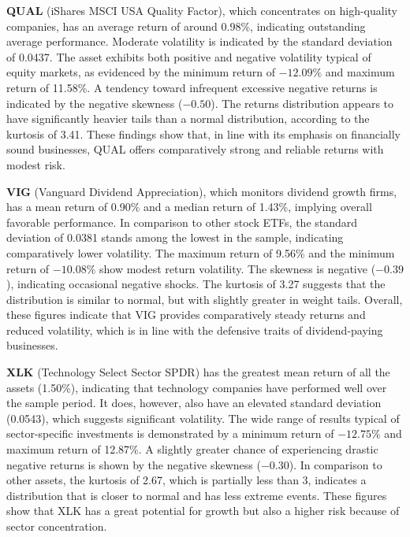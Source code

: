 \documentclass[12pt]{article}
\begin{document}
\textbf{QUAL} (iShares MSCI USA Quality Factor), which concentrates on high-quality companies, has an average return of around 0.98\%, indicating outstanding average performance. Moderate volatility is indicated by the standard deviation of 0.0437. The asset exhibits both positive and negative volatility typical of equity markets, as evidenced by the minimum return of $-12.09\%$ and maximum return of 11.58\%. A tendency toward infrequent excessive negative returns is indicated by the negative skewness ($-0.50$). The returns distribution appears to have significantly heavier tails than a normal distribution, according to the kurtosis of 3.41. These findings show that, in line with its emphasis on financially sound businesses, QUAL offers comparatively strong and reliable returns with modest risk.

\textbf{VIG} (Vanguard Dividend Appreciation), which monitors dividend growth firms, has a mean return of 0.90\% and a median return of 1.43\%, implying overall favorable performance. In comparison to other stock ETFs, the standard deviation of 0.0381 stands among the lowest in the sample, indicating comparatively lower volatility. The maximum return of 9.56\% and the minimum return of $-10.08\%$ show modest return volatility. The skewness is negative ($-0.39$), indicating occasional negative shocks. The kurtosis of 3.27 suggests that the distribution is similar to normal, but with slightly greater in weight tails. Overall, these figures indicate that VIG provides comparatively steady returns and reduced volatility, which is in line with the defensive traits of dividend-paying businesses.

\textbf{XLK} (Technology Select Sector SPDR) has the greatest mean return of all the assets (1.50\%), indicating that technology companies have performed well over the sample period. It does, however, also have an elevated standard deviation (0.0543), which suggests significant volatility. The wide range of results typical of sector-specific investments is demonstrated by a minimum return of $-12.75\%$ and maximum return of 12.87\%. A slightly greater chance of experiencing drastic negative returns is shown by the negative skewness ($-0.30$). In comparison to other assets, the kurtosis of 2.67, which is partially less than 3, indicates a distribution that is closer to normal and has less extreme events. These figures show that XLK has a great potential for growth but also a higher risk because of sector concentration.
\end{document}
